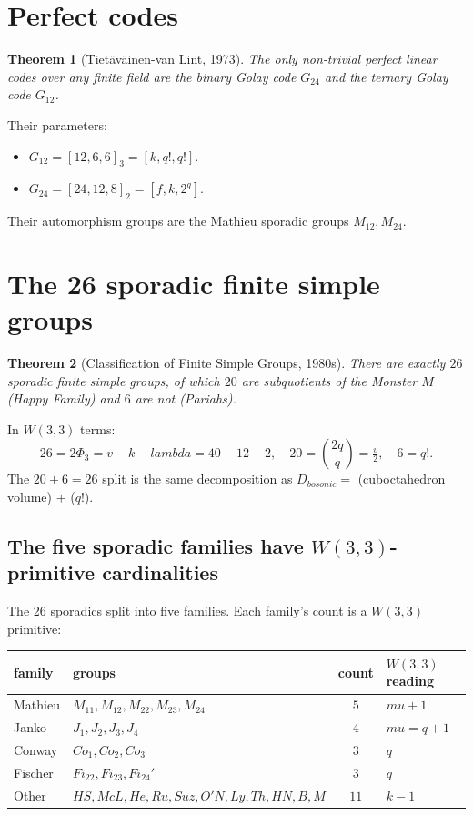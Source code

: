 \documentclass[11pt]{article}
\def\mathbb#1{#1}%
\def\mathrm#1{#1}%
\def\text#1{#1}%
\def\lambda{lambda}%
\def\mu{mu}%
\def\Phi#1{Phi#1}%
\newtheorem*{theorem}{Theorem}
\begin{document}
\section{Perfect codes}

\begin{theorem}[Tietäväinen-van Lint, 1973]
The only non-trivial perfect linear codes over any finite field are the binary Golay code $G_{24}$ and the ternary Golay code $G_{12}$.
\end{theorem}

Their parameters:
\begin{itemize}[leftmargin=2em]
\item $G_{12} = [12, 6, 6]_3 = [k, q!, q!]$.
\item $G_{24} = [24, 12, 8]_2 = [f, k, 2^q]$.
\end{itemize}
Their automorphism groups are the Mathieu sporadic groups $M_{12}, M_{24}$.

\section{The 26 sporadic finite simple groups}

\begin{theorem}[Classification of Finite Simple Groups, 1980s]
There are exactly $26$ sporadic finite simple groups, of which $20$ are subquotients of the Monster $\mathbb{M}$ (Happy Family) and $6$ are not (Pariahs).
\end{theorem}

In $W(3,3)$ terms:
\[
26 = 2\Phi_3 = v - k - \lambda = 40 - 12 - 2, \quad 20 = \binom{2q}{q} = \tfrac{v}{2}, \quad 6 = q!.
\]
The $20 + 6 = 26$ split is the same decomposition as $D_{\text{bosonic}} = $ (cuboctahedron volume) $+$ ($q!$).

\subsection*{The five sporadic families have $W(3,3)$-primitive cardinalities}

The 26 sporadics split into five families. Each family's count is a $W(3,3)$ primitive:

\begin{center}
\renewcommand{\arraystretch}{1.2}
\begin{tabular}{l l c l}
\toprule
family & groups & count & $W(3,3)$ reading \\
\midrule
Mathieu & $M_{11}, M_{12}, M_{22}, M_{23}, M_{24}$ & $5$ & $\mu + 1$ \\
Janko & $J_1, J_2, J_3, J_4$ & $4$ & $\mu = q + 1$ \\
Conway & $\mathrm{Co}_1, \mathrm{Co}_2, \mathrm{Co}_3$ & $3$ & $q$ \\
Fischer & $\mathrm{Fi}_{22}, \mathrm{Fi}_{23}, \mathrm{Fi}_{24}'$ & $3$ & $q$ \\
Other & $\mathrm{HS}, \mathrm{McL}, \mathrm{He}, \mathrm{Ru}, \mathrm{Suz}, \mathrm{O'N}, \mathrm{Ly}, \mathrm{Th}, \mathrm{HN}, \mathrm{B}, \mathbb{M}$ & $11$ & $k - 1$ \\
\bottomrule
\end{tabular}
\end{center}
\end{document}

